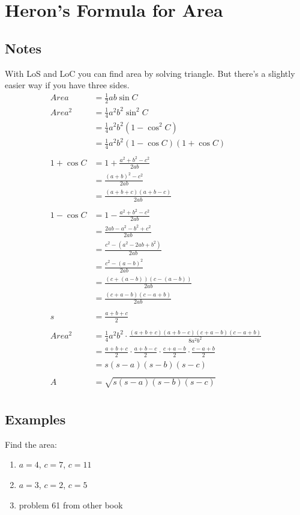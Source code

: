 \documentclass{exam}
\begin{document}
  \section{Heron's Formula for Area}

  \subsection{Notes}
  With LoS and LoC you can find area by solving triangle.  But there's a slightly easier way if you have three sides.
  \begin{align*}
    Area   & = \frac{1}{2} a b \sin C \\
    Area^2 & = \frac{1}{4} a^2 b^2 \sin^2 C \\
           & = \frac{1}{4} a^2 b^2 \left( 1 - \cos^2 C \right) \\
           & = \frac{1}{4} a^2 b^2 ( 1 - \cos C )( 1 + \cos C ) \\
    \\
    1 + \cos C & = 1 + \frac{a^2 + b^2 - c^2}{2ab} \\
               & = \frac{(a + b)^2 - c^2}{2ab} \\
               & = \frac{(a + b + c)(a + b - c)}{2ab} \\
    \\
    1 - \cos C & = 1 - \frac{a^2 + b^2 - c^2}{2ab} \\
               & = \frac{2ab - a^2 - b^2 + c^2}{2ab} \\
               & = \frac{c^2 - (a^2 - 2ab + b^2)}{2ab} \\
               & = \frac{c^2 - (a - b)^2 }{2ab} \\
               & = \frac{(c + (a - b))(c - (a - b))}{2ab} \\
               & = \frac{(c + a - b)(c - a + b)}{2ab} \\
    \\
    s & = \frac{a + b + c}{2} \\
    \\
    Area^2 & = \frac{1}{4} a^2 b^2 \cdot \frac{(a + b + c)(a + b - c)(c + a - b)(c - a + b)}{8a^2b^2} \\
           & = \frac{a + b + c}{2} \cdot \frac{a + b - c}{2} \cdot \frac{c + a - b}{2} \cdot \frac{c - a + b}{2} \\
           & = s (s - a)(s - b)(s - c) \\
    \\
    A & = \sqrt{s (s - a)(s - b)(s - c)} \\
  \end{align*}

  \subsection{Examples}
  
  Find the area:
  \begin{enumerate}
    \item $a = 4$, $c = 7$, $c = 11$
    \item $a = 3$, $c = 2$, $c = 5$

    \item problem 61 from other book
  \end{enumerate}
\end{document}
